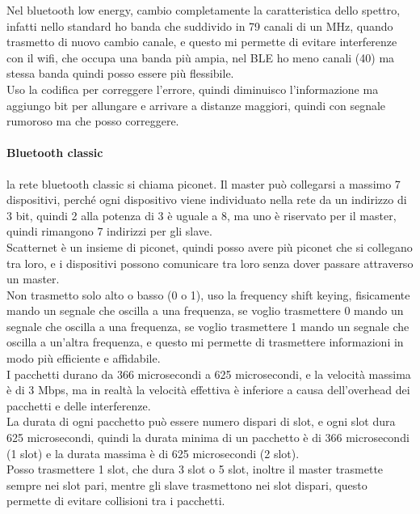 Nel bluetooth low energy, cambio completamente la caratteristica dello spettro, infatti nello standard ho banda che suddivido in 79 canali di un MHz, quando trasmetto di nuovo cambio canale, e questo mi permette di evitare interferenze con il wifi, che occupa una banda più ampia, nel BLE ho meno canali (40) ma stessa banda quindi posso essere più flessibile.\\
Uso la codifica per correggere l'errore, quindi diminuisco l'informazione ma aggiungo bit per allungare e arrivare a distanze maggiori, quindi con segnale rumoroso ma che posso correggere.\\
\paragraph{Bluetooth classic}
la rete bluetooth classic si chiama piconet.
Il master può collegarsi  a massimo 7 dispositivi, perché ogni dispositivo viene individuato nella rete da un indirizzo di 3 bit, quindi 2 alla potenza di 3 è uguale a 8, ma uno è riservato per il master, quindi rimangono 7 indirizzi per gli slave.\\

Scatternet è un insieme di piconet, quindi posso avere più piconet che si collegano tra loro, e i dispositivi possono comunicare tra loro senza dover passare attraverso un master.\\

Non trasmetto solo alto o basso (0 o 1), uso la frequency shift keying, fisicamente mando un segnale che oscilla a una frequenza, se voglio trasmettere 0 mando un segnale che oscilla a una frequenza, se voglio trasmettere 1 mando un segnale che oscilla a un'altra frequenza, e questo mi permette di trasmettere informazioni in modo più efficiente e affidabile.\\

I pacchetti durano da 366 microsecondi a 625 microsecondi, e la velocità massima è di 3 Mbps, ma in realtà la velocità effettiva è inferiore a causa dell'overhead dei pacchetti e delle interferenze.\\ 
La durata di ogni pacchetto può essere numero dispari di slot, e ogni slot dura 625 microsecondi, quindi la durata minima di un pacchetto è di 366 microsecondi (1 slot) e la durata massima è di 625 microsecondi (2 slot).\\
Posso trasmettere 1 slot, che dura 3 slot o 5 slot, inoltre il master trasmette sempre nei slot pari, mentre gli slave trasmettono nei slot dispari, questo permette di evitare collisioni tra i pacchetti.\\ 

